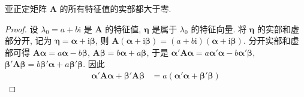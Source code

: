 \documentclass[../../main.tex]{subfiles}
\begin{document}
\begin{proposition}\label{proposition:亚正定矩阵的所有特征值的实部都大于零}
亚正定矩阵 \(\boldsymbol{A}\) 的所有特征值的实部都大于零.
\end{proposition}
\begin{proof}
设 \(\lambda_0 = a + b\mathrm{i}\) 是 \(\boldsymbol{A}\) 的特征值, \(\boldsymbol{\eta}\) 是属于 \(\lambda_0\) 的特征向量. 将 \(\boldsymbol{\eta}\) 的实部和虚部分开, 记为 \(\boldsymbol{\eta}=\boldsymbol{\alpha}+\mathrm{i}\boldsymbol{\beta}\), 则 \(\boldsymbol{A}(\boldsymbol{\alpha}+\mathrm{i}\boldsymbol{\beta})=(a + b\mathrm{i})(\boldsymbol{\alpha}+\mathrm{i}\boldsymbol{\beta})\). 分开实部和虚部可得 \(\boldsymbol{A}\boldsymbol{\alpha}=a\boldsymbol{\alpha}-b\boldsymbol{\beta}\), \(\boldsymbol{A}\boldsymbol{\beta}=b\boldsymbol{\alpha}+a\boldsymbol{\beta}\), 于是 \(\boldsymbol{\alpha}'\boldsymbol{A}\boldsymbol{\alpha}=a\boldsymbol{\alpha}'\boldsymbol{\alpha}-b\boldsymbol{\alpha}'\boldsymbol{\beta}\), \(\boldsymbol{\beta}'\boldsymbol{A}\boldsymbol{\beta}=b\boldsymbol{\beta}'\boldsymbol{\alpha}+a\boldsymbol{\beta}'\boldsymbol{\beta}\). 因此
\begin{align}
\boldsymbol{\alpha}'\boldsymbol{A}\boldsymbol{\alpha}+\boldsymbol{\beta}'\boldsymbol{A}\boldsymbol{\beta}&=a(\boldsymbol{\alpha}'\boldsymbol{\alpha}+\boldsymbol{\beta}'\boldsymbol{\beta})\label{eq:6.11}
\end{align} 

\end{proof}
\end{document}
